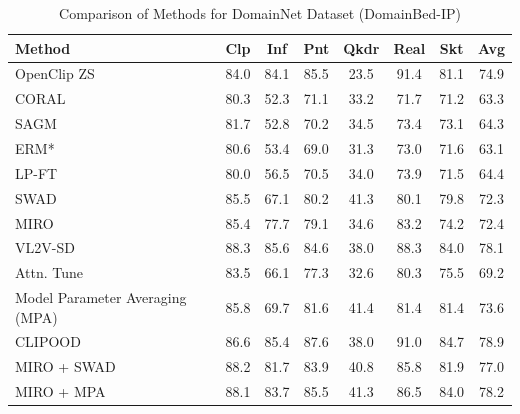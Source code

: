 \documentclass{article} %
\begin{document}
\begin{table}[t]
\small
\centering
\caption{Comparison of Methods for DomainNet Dataset (DomainBed-IP)}
\begin{tabular}{lccccccc}
\toprule
\textbf{Method} & Clp & Inf & Pnt & Qkdr & Real & Skt & Avg \\ \midrule
OpenClip ZS & 84.0 & 84.1 & 85.5 & 23.5 & 91.4 & 81.1 & 74.9\\
\midrule
CORAL & 80.3 & 52.3 & 71.1 & 33.2 & 71.7 & 71.2 & 63.3 \\
SAGM & 81.7 & 52.8 & 70.2 & 34.5 & 73.4 & 73.1 & 64.3 \\ 
ERM* & 80.6 & 53.4 & 69.0 & 31.3 & 73.0 & 71.6 & 63.1 \\ 
LP-FT & 80.0 & 56.5 & 70.5 & 34.0 & 73.9 & 71.5 & 64.4 \\ 
SWAD & 85.5 & 67.1 & 80.2 & 41.3 & 80.1 & 79.8 & 72.3 \\ 
MIRO & 85.4 & 77.7 & 79.1 & 34.6 & 83.2 & 74.2 & 72.4 \\
VL2V-SD & 88.3 & 85.6 & 84.6 & 38.0 & 88.3 & 84.0 & 78.1\\ 
Attn. Tune& 83.5 & 66.1 & 77.3 & 32.6 & 80.3 & 75.5 & 69.2\\ 
Model Parameter Averaging (MPA) & 85.8 & 69.7 & 81.6 & 41.4 & 81.4 & 81.4 & 73.6 \\ 
CLIPOOD & 86.6  & 85.4 &  87.6  & 38.0  & 91.0  & 84.7 & 78.9 \\\hline
MIRO + SWAD & 88.2 & 81.7 & 83.9 & 40.8 & 85.8 & 81.9 & 77.0 \\ 
MIRO + MPA & 88.1 & 83.7 & 85.5 & 41.3 & 86.5 & 84.0 & 78.2 \\
\bottomrule
\end{tabular}
\label{table:DomainNet IP}
\end{table}
\end{document}
